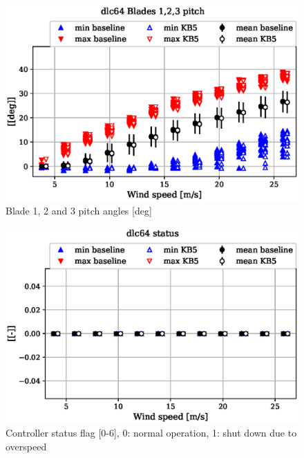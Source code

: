 \begin{figure}[!ht]
\begin{center}
	\includegraphics[width=.85\linewidth]{figures/baseline-vs-KB6/dlc64/bearing-pitch1-angle-deg_AA0007_AA0003.eps}
\end{center}
\caption{Blade 1, 2 and 3 pitch angles [deg]}
\label{fig:baseline-vs-KB6:dlc64:pitch}
\end{figure}

\begin{figure}[!ht]
\begin{center}
	\includegraphics[width=.85\linewidth]{figures/baseline-vs-KB6/dlc64/DLL-dtu_we_controller-inpvec-22_AA0007_AA0003.eps}
\end{center}
\caption{Controller status flag [0-6], 0: normal operation, 1: shut down due to overspeed}
\label{fig:baseline-vs-KB6:dlc64:status}
\end{figure}

